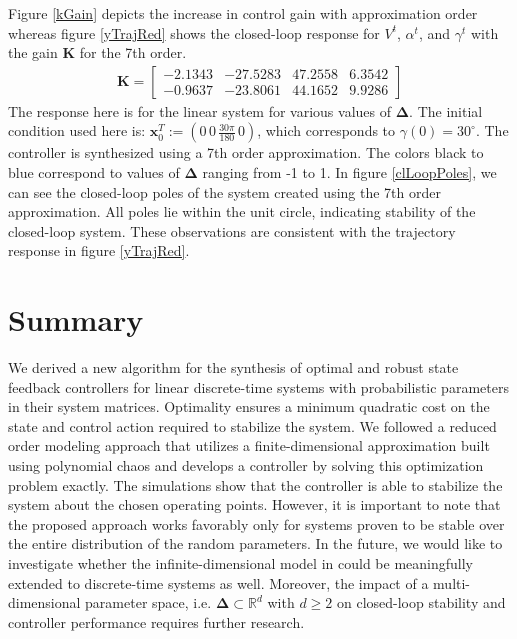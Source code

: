 \documentclass[letterpaper, 10 pt, conference]{ieeeconf}  %
\newcommand{\real}{\mathbb{R}}
\newcommand{\vo}[1]{\boldsymbol{#1}}
\newcommand{\Del}{\vo{\Delta}}
\begin{document}
Figure \ref{kGain} depicts the increase in control gain with approximation order whereas figure \ref{yTrajRed} shows the closed-loop response for $V^t$, $\alpha^t$, and $\gamma^t$ with the gain $\vo{K}$ for the 7th order.
\begin{align*}
\vo{K} = \begin{bmatrix}
-2.1343 & -27.5283  & 47.2558   & 6.3542 \\
-0.9637 & -23.8061  & 44.1652   & 9.9286
\end{bmatrix}
\end{align*}
The response here is for the linear system for various values of $\Del$.
The initial condition used here is: $\vo{x}_0^T := (0\, 0\, \frac{30 \pi}{180}\, 0)$, which corresponds
to $\gamma(0) = 30^{\circ}$.
The controller is synthesized using a 7th order approximation. The colors black to blue correspond to values of $\Del$ ranging from -1 to 1.
In figure \ref{clLoopPoles}, we can see the closed-loop poles of the system created using the 7th order approximation. All poles lie within the unit circle, indicating stability of the closed-loop system. These observations are consistent with the trajectory response in figure \ref{yTrajRed}.

\section{Summary}
We derived a new algorithm for the synthesis of optimal and robust state feedback controllers for linear discrete-time systems with probabilistic parameters in their system matrices. Optimality ensures a minimum quadratic cost on the state and control action required to stabilize the system.
We followed a reduced order modeling approach that utilizes a finite-dimensional approximation built using polynomial chaos and develops a controller by solving this optimization problem exactly.
The simulations show that the controller is able to stabilize the system about the chosen operating points. %
However, it is important to note that the proposed approach works favorably only for systems proven to be stable over the entire distribution of the random parameters.
In the future, we would like to investigate whether the infinite-dimensional model in \cite{bhattacharya2019robust} could be meaningfully extended to discrete-time systems as well.
Moreover, the impact of a multi-dimensional parameter space, i.e. $\Del \subset \real^d$ with $d \geq 2$ on closed-loop stability and controller performance requires further research.
\end{document}
